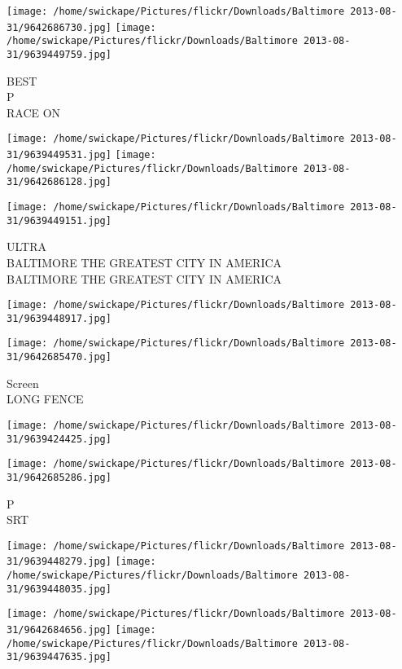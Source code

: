 \documentclass[10pt,letterpaper]{article}
\begin{document}
\vspace{0.25in}
\texttt{[image: /home/swickape/Pictures/flickr/Downloads/Baltimore 2013-08-31/9642686730.jpg]}
\texttt{[image: /home/swickape/Pictures/flickr/Downloads/Baltimore 2013-08-31/9639449759.jpg]}

BEST\\
P\\
RACE ON
\pagebreak

\texttt{[image: /home/swickape/Pictures/flickr/Downloads/Baltimore 2013-08-31/9639449531.jpg]}
\texttt{[image: /home/swickape/Pictures/flickr/Downloads/Baltimore 2013-08-31/9642686128.jpg]}

\vspace{0.25in}
\texttt{[image: /home/swickape/Pictures/flickr/Downloads/Baltimore 2013-08-31/9639449151.jpg]}

ULTRA\\
BALTIMORE THE GREATEST CITY IN AMERICA\\
BALTIMORE THE GREATEST CITY IN AMERICA
\pagebreak

\texttt{[image: /home/swickape/Pictures/flickr/Downloads/Baltimore 2013-08-31/9639448917.jpg]}

\vspace{0.25in}
\texttt{[image: /home/swickape/Pictures/flickr/Downloads/Baltimore 2013-08-31/9642685470.jpg]}

Screen\\
LONG FENCE
\pagebreak

\texttt{[image: /home/swickape/Pictures/flickr/Downloads/Baltimore 2013-08-31/9639424425.jpg]}

\vspace{0.25in}
\texttt{[image: /home/swickape/Pictures/flickr/Downloads/Baltimore 2013-08-31/9642685286.jpg]}

P\\
SRT
\pagebreak

\texttt{[image: /home/swickape/Pictures/flickr/Downloads/Baltimore 2013-08-31/9639448279.jpg]}
\texttt{[image: /home/swickape/Pictures/flickr/Downloads/Baltimore 2013-08-31/9639448035.jpg]}

\texttt{[image: /home/swickape/Pictures/flickr/Downloads/Baltimore 2013-08-31/9642684656.jpg]}
\texttt{[image: /home/swickape/Pictures/flickr/Downloads/Baltimore 2013-08-31/9639447635.jpg]}
\end{document}
